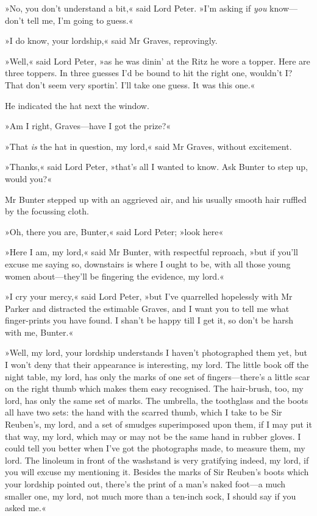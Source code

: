 »No, you don't understand a bit,« said Lord Peter. »I'm asking if \textit{you} know—don't tell me, I'm going to guess.«

»I do know, your lordship,« said Mr Graves, reprovingly.

»Well,« said Lord Peter, »as he was dinin' at the Ritz he wore a topper. Here are three toppers. In three guesses I'd be bound to hit the right one, wouldn't I? That don't seem very sportin'. I'll take one guess. It was this one.«

He indicated the hat next the window.

»Am I right, Graves—have I got the prize?«

»That \textit{is} the hat in question, my lord,« said Mr Graves, without excitement.

»Thanks,« said Lord Peter, »that's all I wanted to know. Ask Bunter to step up, would you?«

Mr Bunter stepped up with an aggrieved air, and his usually smooth hair ruffled by the focussing cloth.

»Oh, there you are, Bunter,« said Lord Peter; »look here\longdash«

»Here I am, my lord,« said Mr Bunter, with respectful reproach, »but if you'll excuse me saying so, downstairs is where I ought to be, with all those young women about—they'll be fingering the evidence, my lord.«

»I cry your mercy,« said Lord Peter, »but I've quarrelled hopelessly with Mr Parker and distracted the estimable Graves, and I want you to tell me what finger-prints you have found. I shan't be happy till I get it, so don't be harsh with me, Bunter.«

»Well, my lord, your lordship understands I haven't photographed them yet, but I won't deny that their appearance is interesting, my lord. The little book off the night table, my lord, has only the marks of one set of fingers—there's a little scar on the right thumb which makes them easy recognised. The hair-brush, too, my lord, has only the same set of marks. The umbrella, the toothglass and the boots all have two sets: the hand with the scarred thumb, which I take to be Sir Reuben's, my lord, and a set of smudges superimposed upon them, if I may put it that way, my lord, which may or may not be the same hand in rubber gloves. I could tell you better when I've got the photographs made, to measure them, my lord. The linoleum in front of the washstand is very gratifying indeed, my lord, if you will excuse my mentioning it. Besides the marks of Sir Reuben's boots which your lordship pointed out, there's the print of a man's naked foot—a much smaller one, my lord, not much more than a ten-inch sock, I should say if you asked me.«

